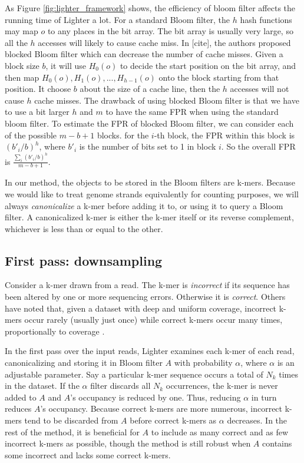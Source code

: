 \documentclass[10pt]{article}
\begin{document}
As Figure \ref{fig:lighter_framework} shows, the efficiency of bloom filter affects the running time of Lighter a lot. For a standard Bloom filter, the $h$ hash functions may map $o$ to any places in the bit array. The bit array is usually very large, so all the $h$ accesses will likely to cause cache miss. In [cite], the authors proposed blocked Bloom filter which can decrease the number of cache misses. Given a block size $b$, it will use $H_0(o)$ to decide the start position on the bit array, and then map $H_0(o), H_1(o),...,H_{h-1}(o)$ onto the block starting from that position. It choose $b$ about the size of a cache line, then the $h$ accesses will not cause $h$ cache misses. The drawback of using blocked Bloom filter is that we have to use a bit larger $h$ and $m$ to have the same FPR when using the standard bloom filter. To estimate the FPR of blocked Bloom filter, we can consider each of the possible $m-b+1$ blocks. for the $i$-th block, the FPR within this block is $(b'_i/b)^h$, where $b'_i$ is the number of bits set to 1 in block $i$. So the overall FPR is $\displaystyle\frac{\sum_i (b'_i/b)^h}{m-b+1}$.

In our method, the objects to be stored in the Bloom filters are k-mers.  Because we would like to treat genome strands equivalently for counting purposes, we will always \emph{canonicalize} a k-mer before adding it to, or using it to query a Bloom filter.  A canonicalized k-mer is either the k-mer itself or its reverse complement, whichever is less than or equal to the other.

\subsection*{First pass: downsampling}

Consider a k-mer drawn from a read.  The k-mer is \emph{incorrect} if its sequence has been altered by one or more sequencing errors.  Otherwise it is \emph{correct}.  Others have noted that, given a dataset with deep and uniform coverage, incorrect k-mers occur rarely (usually just once) while correct k-mers occur many times, proportionally to coverage \cite{pevzner2001eulerian, chaisson2004fragment}.

In the first pass over the input reads, Lighter examines each k-mer of each read, canonicalizing and storing it in Bloom filter $A$ with probability $\alpha$, where $\alpha$ is an adjustable parameter.  Say a particular k-mer sequence occurs a total of $N_k$ times in the dataset.  If the $\alpha$ filter discards all $N_k$ occurrences, the k-mer is never added to $A$ and $A$'s occupancy is reduced by one.  Thus, reducing $\alpha$ in turn reduces $A$'s occupancy.  Because correct k-mers are more numerous, incorrect k-mers tend to be discarded from $A$ before correct k-mers as $\alpha$ decreases.  In the rest of the method, it is beneficial for $A$ to include as many correct and as few incorrect k-mers as possible, though the method is still robust when $A$ contains some incorrect and lacks some correct k-mers.
\end{document}
